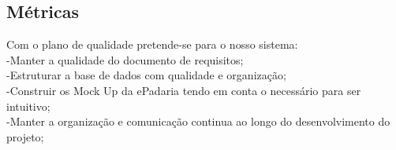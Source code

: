 \subsection{Métricas}
Com o plano de qualidade pretende-se para o nosso sistema:\\
-Manter a qualidade do documento de requisitos;\\
-Estruturar a base de dados com qualidade e organização;\\
-Construir os Mock Up da ePadaria tendo em conta o necessário para ser intuitivo;\\
-Manter a organização e comunicação continua ao longo do desenvolvimento do projeto;\\